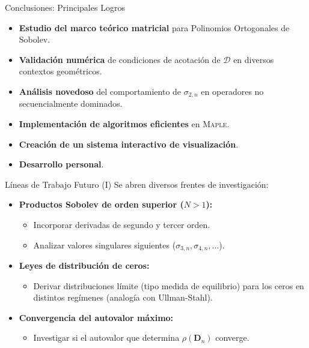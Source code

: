 \begin{frame}{Conclusiones: Principales Logros}
	\begin{itemize}
		\item \textbf{Estudio del marco teórico matricial} para Polinomios Ortogonales de Sobolev.
		\item \textbf{Validación numérica} de condiciones de acotación de $\mathcal{D}$ en diversos contextos geométricos.
		\item \textbf{Análisis novedoso} del comportamiento de $\sigma_{2,n}$ en operadores no secuencialmente dominados.
		\item \textbf{Implementación de algoritmos eficientes} en \textsc{Maple}.
		\item \textbf{Creación de un sistema interactivo de visualización}.
		\item \textbf{Desarrollo personal}.
	\end{itemize}
\end{frame}

\begin{frame}{Líneas de Trabajo Futuro (I)}
	Se abren diversos frentes de investigación:
	\begin{itemize}
		\item \textbf{Productos Sobolev de orden superior ($N>1$):}
		      \begin{itemize}
			      \item Incorporar derivadas de segundo y tercer orden.
			      \item Analizar valores singulares siguientes ($\sigma_{3,n}, \sigma_{4,n},...$).
		      \end{itemize}
		      \pause
		\item \textbf{Leyes de distribución de ceros:}
		      \begin{itemize}
			      \item Derivar distribuciones límite (tipo medida de equilibrio) para los ceros en distintos regímenes (analogía con Ullman-Stahl).
		      \end{itemize}
		      \pause
		\item \textbf{Convergencia del autovalor máximo:}
		      \begin{itemize}
			      \item Investigar si el autovalor que determina $\rho(\mathbf{D}_n)$ converge.
		      \end{itemize}
	\end{itemize}
\end{frame}

